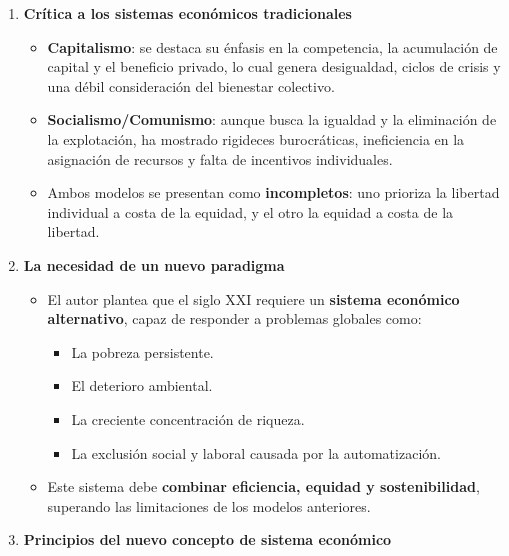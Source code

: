\documentclass[12pt]{report} %
\providecommand{\tightlist}{%
  \setlength{\itemsep}{0pt}\setlength{\parskip}{0pt}}
\begin{document}
\begin{enumerate}
\def\labelenumi{\arabic{enumi}.}
\item
  \textbf{Crítica a los sistemas económicos tradicionales}

  \begin{itemize}
  \tightlist
  \item
    \textbf{Capitalismo}: se destaca su énfasis en la competencia, la
    acumulación de capital y el beneficio privado, lo cual genera
    desigualdad, ciclos de crisis y una débil consideración del
    bienestar colectivo.
  \item
    \textbf{Socialismo/Comunismo}: aunque busca la igualdad y la
    eliminación de la explotación, ha mostrado rigideces burocráticas,
    ineficiencia en la asignación de recursos y falta de incentivos
    individuales.
  \item
    Ambos modelos se presentan como \textbf{incompletos}: uno prioriza
    la libertad individual a costa de la equidad, y el otro la equidad a
    costa de la libertad.
  \end{itemize}
\item
  \textbf{La necesidad de un nuevo paradigma}

  \begin{itemize}
  \tightlist
  \item
    El autor plantea que el siglo XXI requiere un \textbf{sistema
    económico alternativo}, capaz de responder a problemas globales
    como:

    \begin{itemize}
    \tightlist
    \item
      La pobreza persistente.
    \item
      El deterioro ambiental.
    \item
      La creciente concentración de riqueza.
    \item
      La exclusión social y laboral causada por la automatización.
    \end{itemize}
  \item
    Este sistema debe \textbf{combinar eficiencia, equidad y
    sostenibilidad}, superando las limitaciones de los modelos
    anteriores.
  \end{itemize}
\item
  \textbf{Principios del nuevo concepto de sistema económico}


\end{enumerate}
\end{document}
